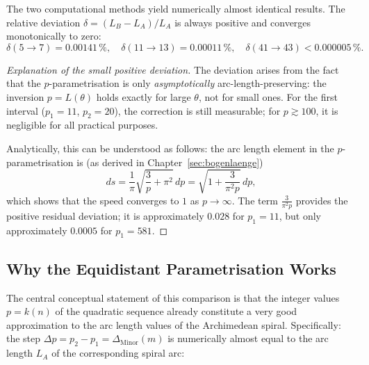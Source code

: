 \begin{proposition}
\label{prop:methoden_uebereinstimmung}
The two computational methods yield numerically almost identical results.
The relative deviation $\delta = (L_B - L_A)/L_A$ is always positive and converges
monotonically to zero:
\[
\delta(5 \to 7) = 0.00141\,\%,\quad
\delta(11 \to 13) = 0.00011\,\%,\quad
\delta(41 \to 43) < 0.000005\,\%.
\]
\end{proposition}

\begin{proof}[Explanation of the small positive deviation]
The deviation arises from the fact that the $p$-parametrisation is only
\emph{asymptotically} arc-length-preserving: the inversion $p = L(\theta)$ holds exactly
for large $\theta$, not for small ones. For the first interval ($p_1 = 11$,
$p_2 = 20$), the correction is still measurable; for $p \gtrsim 100$, it is
negligible for all practical purposes.

Analytically, this can be understood as follows: the arc length element in the
$p$-parametrisation is (as derived in Chapter~\ref{sec:bogenlaenge})
\[
ds = \frac{1}{\pi}\sqrt{\frac{3}{p}+\pi^2}\,dp
   = \sqrt{1 + \frac{3}{\pi^2 p}}\,dp,
\]
which shows that the speed converges to $1$ as $p \to \infty$.
The term $\frac{3}{\pi^2 p}$ provides the positive residual deviation; it is
approximately $0.028$ for $p_1 = 11$, but only approximately $0.0005$ for $p_1 = 581$.
\end{proof}

\subsection{Why the Equidistant Parametrisation Works}

The central conceptual statement of this comparison is that the
integer values $p = k(n)$ of the quadratic sequence already constitute a very good
approximation to the arc length values of the Archimedean spiral. Specifically:
the step $\Delta p = p_2 - p_1 = \Delta_{\mathrm{Minor}}(m)$ is numerically
almost equal to the arc length $L_A$ of the corresponding spiral arc:

